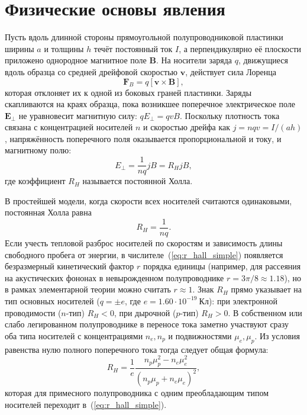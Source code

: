 \documentclass[reprint, amsmath, amssymb, aps, pra, nofootinbib]{revtex4-2}
\begin{document}
\section{Физические основы явления}
Пусть вдоль длинной стороны прямоугольной полупроводниковой пластинки ширины $a$ и толщины $h$ течёт постоянный ток $I$, а перпендикулярно её плоскости приложено однородное магнитное поле $\bm{B}$.
На носители заряда $q$, движущиеся вдоль образца со средней дрейфовой скоростью $\bm{v}$, действует сила Лоренца
\begin{equation}
\bm{F}_B = q [\bm{v} \times \bm{B}],
\label{eq:lorentz}
\end{equation}
которая отклоняет их к одной из боковых граней пластинки.
Заряды скапливаются на краях образца, пока возникшее поперечное электрическое поле $\bm{E}_\perp$ не уравновесит магнитную силу: $q E_\perp = q v B$.
Поскольку плотность тока связана с концентрацией носителей $n$ и скоростью дрейфа как $j = n q v = I / (a h)$, напряжённость поперечного поля оказывается пропорциональной и току, и магнитному полю:
\begin{equation}
E_\perp = \frac{1}{n q} j B = R_H j B,
\label{eq:e_hall}
\end{equation}
где коэффициент $R_H$ называется постоянной Холла.

В простейшей модели, когда скорости всех носителей считаются одинаковыми, постоянная Холла равна
\begin{equation}
R_H = \frac{1}{n q}.
\label{eq:r_hall_simple}
\end{equation}
Если учесть тепловой разброс носителей по скоростям и зависимость длины свободного пробега от энергии, в числителе~(\ref{eq:r_hall_simple}) появляется безразмерный кинетический фактор $r$ порядка единицы (например, для рассеяния на акустических фононах в невырожденном полупроводнике $r = 3\pi/8 \approx 1.18$), но в рамках элементарной теории можно считать $r \approx 1$.
Знак $R_H$ прямо указывает на тип основных носителей ($q = \pm e$, где $e = 1.60 \cdot 10^{-19}~\text{Кл}$): при электронной проводимости ($n$-тип) $R_H < 0$, при дырочной ($p$-тип) $R_H > 0$.
В собственном или слабо легированном полупроводнике в переносе тока заметно участвуют сразу оба типа носителей с концентрациями $n_e, n_p$ и подвижностями $\mu_e, \mu_p$. Из условия равенства нулю полного поперечного тока тогда следует общая формула:
\begin{equation}
R_H = \frac{1}{e} \frac{n_p \mu_p^2 - n_e \mu_e^2}{(n_p \mu_p + n_e \mu_e)^2},
\label{eq:r_hall_two}
\end{equation}
которая для примесного полупроводника с одним преобладающим типом носителей переходит в~(\ref{eq:r_hall_simple}).
\end{document}
